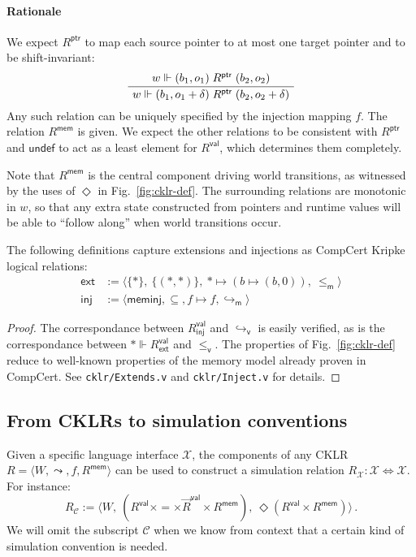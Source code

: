 \documentclass[acmsmall,authordraft]{acmart}
\newcommand{\kw}[1]{\ensuremath{ \mathsf{#1} }}
\newcommand{\vref}{\le_\kw{v}}
\newcommand{\mext}{\le_\kw{m}}
\begin{document}
\paragraph{Rationale}

We expect $R^\kw{ptr}$ to map
each source pointer to at most one target pointer
and to be shift-invariant:
\[
  \AxiomC{$w \Vdash (b_1, o_1) \mathrel{R^\kw{ptr}} (b_2, o_2)$}
  \UnaryInfC{$w \Vdash (b_1, o_1 + \delta) \mathrel{R^\kw{ptr}} (b_2, o_2 + \delta)$}
  \DisplayProof
\]
Any such relation can be uniquely specified by
the injection mapping $f$.
The relation $R^\kw{mem}$ is given.
We expect the other relations to be consistent with $R^\kw{ptr}$
and $\kw{undef}$ to act as a least element for $R^\kw{val}$,
which determines them completely.

Note that $R^\kw{mem}$
is the central component driving world transitions,
as witnessed by the uses of $\Diamond$ in Fig.~\ref{fig:cklr-def}.
The surrounding relations are monotonic in $w$,
so that any extra state
constructed from pointers and runtime values
will be able to ``follow along'' when
world transitions occur.

\begin{theorem}
The following definitions capture extensions and
injections as CompCert Kripke logical relations:
\begin{align*}
  \kw{ext} &:=
    \langle \{*\}, \: \{(*,*)\}, \: * \mapsto (b \mapsto (b, 0)), \:
    {\mext} \rangle
  \\
  \kw{inj} &:=
    \langle \kw{meminj}, {\subseteq}, f \mapsto f,
      {\hookrightarrow_\kw{m}} \rangle
\end{align*}
\begin{proof}
The correspondance between $R^\kw{val}_\kw{inj}$ and
$\hookrightarrow_\kw{v}$ is easily verified,
as is the correspondance between
$* \Vdash R^\kw{val}_\kw{ext}$ and $\vref$.
The properties of Fig.~\ref{fig:cklr-def}
reduce to well-known properties of the memory model
already proven in CompCert.
See \texttt{cklr/Extends.v} and \texttt{cklr/Inject.v}
for details.
\end{proof}
\end{theorem}


\subsection{From CKLRs to simulation conventions} \label{sec:param} %

Given a specific language interface $\mathcal{X}$,
the components of any CKLR
$R = \langle W, {\leadsto}, f, R^\kw{mem} \rangle$
can be used to construct a simulation relation
$R_\mathcal{X} : \mathcal{X} \Leftrightarrow \mathcal{X}$.
For instance:
\[
  R_\mathcal{C} :=
    \langle
      W, \:
      (R^\kw{val} \times {=} \times \vec{R}^\kw{val} \times R^\kw{mem}), \:
      \Diamond (R^\kw{val} \times R^\kw{mem})
    \rangle \,.
\]
We will omit the subscript $\mathcal{C}$ when we know from context
that a certain kind of simulation convention is needed.
\end{document}
